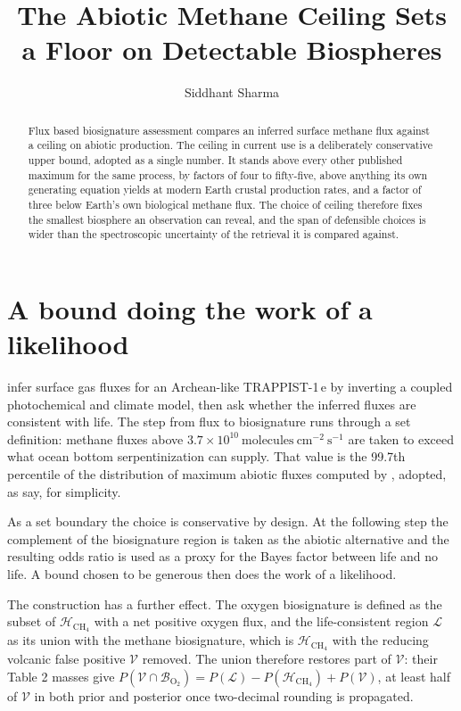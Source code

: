 \documentclass{aastex701}
\newcommand{\flux}{\mathrm{molecules\ cm^{-2}\ s^{-1}}}
\begin{document}
\title{The Abiotic Methane Ceiling Sets a Floor on Detectable Biospheres}

\author{Siddhant Sharma}

\begin{abstract}
Flux based biosignature assessment compares an inferred surface methane flux against
a ceiling on abiotic production. The ceiling in current use is a deliberately
conservative upper bound, adopted as a single number. It stands above every other published maximum for the same
process, by factors of four to fifty-five, above anything its own generating equation
yields at modern Earth crustal production rates, and a factor of three below Earth's
own biological methane flux. The choice
of ceiling therefore fixes the smallest biosphere an observation can reveal, and the
span of defensible choices is wider than the spectroscopic uncertainty of the
retrieval it is compared against.
\end{abstract}

\section{A bound doing the work of a likelihood} \label{sec:setup}

\citet{wogan2026} infer surface gas fluxes for an Archean-like TRAPPIST-1\,e by
inverting a coupled photochemical and climate model, then ask whether the inferred
fluxes are consistent with life. The step from flux to biosignature runs through a
set definition: methane fluxes above $3.7\times10^{10}\ \flux$ are taken to exceed
what ocean bottom serpentinization can supply. That value is the 99.7th percentile
of the distribution of maximum abiotic fluxes computed by \citet{kt2018}, adopted,
as \citet{wogan2026} say, for simplicity.

As a set boundary the choice is conservative by design. At the following step the
complement of the biosignature region is
taken as the abiotic alternative and the resulting odds ratio is used as a proxy for
the Bayes factor between life and no life. A bound chosen to be generous then does
the work of a likelihood.

The construction has a further effect. The oxygen biosignature is defined as the
subset of $\mathcal{H}_{\mathrm{CH_4}}$ with a net positive oxygen flux, and the
life-consistent region $\mathcal{L}$ as its union with the methane biosignature,
which is $\mathcal{H}_{\mathrm{CH_4}}$ with the reducing volcanic false positive
$\mathcal{V}$ removed. The union therefore restores part of $\mathcal{V}$: their
Table 2 masses give $P(\mathcal{V}\cap\mathcal{B}_{\mathrm{O_2}}) = P(\mathcal{L})
- P(\mathcal{H}_{\mathrm{CH_4}}) + P(\mathcal{V})$, at least half of $\mathcal{V}$
in both prior and posterior once two-decimal rounding is propagated.
\end{document}
